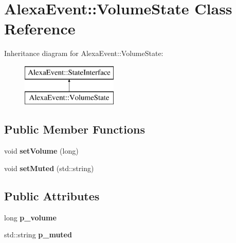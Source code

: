 \hypertarget{classAlexaEvent_1_1VolumeState}{}\section{Alexa\+Event\+:\+:Volume\+State Class Reference}
\label{classAlexaEvent_1_1VolumeState}
Inheritance diagram for Alexa\+Event\+:\+:Volume\+State\+:\begin{figure}[H]
\begin{center}
\leavevmode
\includegraphics[height=2.000000cm]{da/de9/classAlexaEvent_1_1VolumeState}
\end{center}
\end{figure}
\subsection*{Public Member Functions}
\begin{DoxyCompactItemize}
\item 
\mbox{\label{classAlexaEvent_1_1VolumeState_a1e961099d95de28ba5ede626e0151a6e}} 
void {\bfseries set\+Volume} (long)
\item 
\mbox{\label{classAlexaEvent_1_1VolumeState_abb5b8806261e97cd4cd3d40cd932d6f2}} 
void {\bfseries set\+Muted} (std\+::string)
\end{DoxyCompactItemize}
\subsection*{Public Attributes}
\begin{DoxyCompactItemize}
\item 
\mbox{\label{classAlexaEvent_1_1VolumeState_a4fe72587a83d4e13b77d6cdec98798eb}} 
long {\bfseries p\+\_\+volume}
\item 
\mbox{\label{classAlexaEvent_1_1VolumeState_a9f43af29aa075f1c3583984afbe9bb52}} 
std\+::string {\bfseries p\+\_\+muted}
\end{DoxyCompactItemize}
